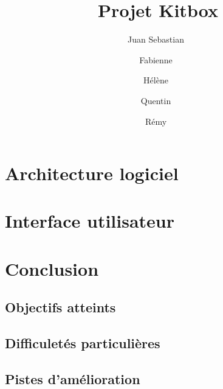 \documentclass[a4paper, 11pt]{article}
\title{Projet Kitbox}
\author{
    Juan Sebastian~\sc{Barrera Vega} \and
    Fabienne~\sc{Chartier} \and 
    Hélène~\sc{de Lamine de Bex} \and
    Quentin~\sc{Stenhouse} \and
    Rémy~\sc{Taymans}
}
\begin{document}
\sffamily
\maketitle

\setcounter{tocdepth}{1}
\tableofcontents
\normalfont

\newpage

\section{Architecture logiciel}


\section{Interface utilisateur}


\section{Conclusion}

\subsection{Objectifs atteints}

\subsection{Difficuletés particulières}

\subsection{Pistes d'amélioration}
\end{document}
